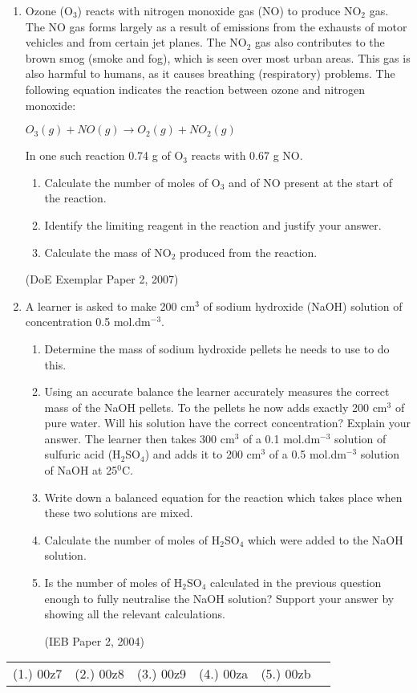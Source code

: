 \begin{eocexercises}{}
\begin{enumerate}
\item{Ozone (O$_{3}$) reacts with nitrogen monoxide gas (NO) to produce NO$_{2}$ gas. The NO gas forms largely as a result of emissions from the exhausts of motor vehicles and from certain jet planes. The NO$_{2}$ gas also contributes to the brown smog (smoke and fog), which is seen over most urban areas. This gas is also harmful to humans, as it causes breathing (respiratory) problems. The following equation indicates the reaction between ozone and nitrogen monoxide:
\begin{center}
\rm${O_{3}(g) + NO(g) \rightarrow O_{2}(g) + NO_{2}(g)}$
\end{center}
In one such reaction 0.74 g of O$_{3}$ reacts with 0.67 g NO.
\begin{enumerate}
\item{Calculate the number of moles of O$_{3}$ and of NO present at the start of the reaction.}
\item{Identify the limiting reagent in the reaction and justify your answer.}
\item{Calculate the mass of NO$_{2}$ produced from the reaction.}
\end{enumerate}
(DoE Exemplar Paper 2, 2007)}
\item{A learner is asked to make 200 cm$^{3}$ of sodium hydroxide (NaOH) solution of concentration 0.5 mol.dm$^{-3}$.
\begin{enumerate}
\item{Determine the mass of sodium hydroxide pellets he needs to use to do this.}
\item{Using an accurate balance the learner accurately measures the correct mass of the NaOH pellets. To the pellets he now adds exactly 200 cm$^{3}$ of pure water. Will his solution have the correct concentration? Explain your answer.
\newline
The learner then takes 300 cm$^{3}$ of a 0.1 mol.dm$^{-3}$ solution of sulfuric acid (H$_{2}$SO$_{4}$) and adds it to 200 cm$^{3}$ of a 0.5 mol.dm$^{-3}$ solution of NaOH at 25$^{0}$C.}
\item{Write down a balanced equation for the reaction which takes place when these two solutions are mixed.}
\item{Calculate the number of moles of H$_{2}$SO$_{4}$ which were added to the NaOH solution.}
\item{Is the number of moles of H$_{2}$SO$_{4}$ calculated in the previous question enough to fully neutralise the NaOH solution? Support your answer by showing all the relevant calculations.}

(IEB Paper 2, 2004)
\end{enumerate}
}
\end{enumerate}

\practiceinfo

\begin{tabular}[h]{cccccc}
(1.) 00z7 & (2.) 00z8 & (3.) 00z9 & (4.) 00za & (5.) 00zb & 
 \end{tabular}
\end{eocexercises}








